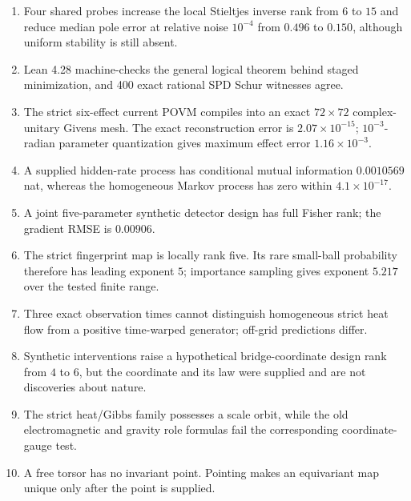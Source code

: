 \documentclass[11pt,a4paper,openany]{report}
\begin{document}
\begin{enumerate}
\item 
Four shared probes increase the local Stieltjes inverse rank from \(6\) to \(15\) and reduce median pole error at relative noise \(10^{-4}\) from \(0.496\) to \(0.150\), although uniform stability is still absent.

\item 
Lean 4.28 machine-checks the general logical theorem behind staged minimization, and 400 exact rational SPD Schur witnesses agree.

\item 
The strict six-effect current POVM compiles into an exact \(72\times72\) complex-unitary Givens mesh. The exact reconstruction error is \(2.07\times10^{-15}\); \(10^{-3}\)-radian parameter quantization gives maximum effect error \(1.16\times10^{-3}\).

\item 
A supplied hidden-rate process has conditional mutual information \(0.0010569\) nat, whereas the homogeneous Markov process has zero within \(4.1\times10^{-17}\).

\item 
A joint five-parameter synthetic detector design has full Fisher rank; the gradient RMSE is \(0.00906\).

\item 
The strict fingerprint map is locally rank five. Its rare small-ball probability therefore has leading exponent \(5\); importance sampling gives exponent \(5.217\) over the tested finite range.

\item 
Three exact observation times cannot distinguish homogeneous strict heat flow from a positive time-warped generator; off-grid predictions differ.

\item 
Synthetic interventions raise a hypothetical bridge-coordinate design rank from \(4\) to \(6\), but the coordinate and its law were supplied and are not discoveries about nature.

\item 
The strict heat/\allowbreak{}Gibbs family possesses a scale orbit, while the old electromagnetic and gravity role formulas fail the corresponding coordinate-gauge test.

\item 
A free torsor has no invariant point. Pointing makes an equivariant map unique only after the point is supplied.

\end{enumerate}
\end{document}
